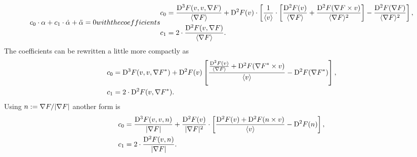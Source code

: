 \begin{subequations}
    \begin{align}
        c_0 \mult \alpha  +
        c_1 \mult \dot{ \alpha }  +
        \ddot{ \alpha }
        =
        0
    \end{align}
    with the coefficients
    \begin{align}
        c_0
        &=
        \frac{ \diff{3}{F}( v, v, \grad{F} ) }{ \skaq{\grad{F}} }  +
        \diff{2}{F}( v ) \mult
        \left[ \frac{ 1 }{ \skaq{v} } \mult
        \left[ \frac{ \diff{2}{F}( v ) }{ \skaq{\grad{F}} }  +
        \frac{ \diff{2}{F}( \grad{F} \times v ) }{ \skaq{\grad{F}}^2 } \right]
        -  \frac{ \diff{2}{F}( \grad{F} ) }{ \skaq{\grad{F}}^2 } \right] ,
        \\
        c_1
        &=
        2 \mult \frac{ \diff{2}{F}( v, \grad{F} ) }{ \skaq{\grad{F}} } .
    \end{align}
\end{subequations}
The coefficients can be rewritten a little more compactly as
\begin{subequations}
    \begin{align}
        c_0   &=
        \mathrm{D}^{ 3 }F( v, v, {\nabla F}^* )  +
        \mathrm{D}^{ 2 }F( v )
        \left[ \frac{ \frac{ \mathrm{D}^{ 2 }F( v ) }{ \langle \nabla F \rangle }  +
        \mathrm{D}^{ 2 }F( {\nabla F}^* \times v ) }{ \langle v \rangle }  -
        \mathrm{D}^{ 2 }F( {\nabla F}^* ) \right] ,
        \\
        c_1   &=   2 \cdot \mathrm{D}^{ 2 }F( v, {\nabla F}^* ) .
    \end{align}
\end{subequations}
Using $ n  :=  \nabla F / \lvert  \nabla F  \rvert $ another form is
\begin{subequations}
    \begin{align}
        c_0
        &=
        \frac{ \mathrm{D}^{ 3 }F( v, v, n ) }{ \lvert \nabla F \rvert }  +
        \frac{ \mathrm{D}^{ 2 }F( v ) }{ \lvert  \nabla F  \rvert^2 } \cdot
        \left[
        \frac{ \mathrm{D}^{ 2 }F( v ) +
        \mathrm{D}^{ 2 }F( n \times v ) }{ \langle v \rangle }
        -  \mathrm{D}^{ 2 }F( n ) \right] ,
        \\
        c_1
        &=
        2 \cdot \frac{ \mathrm{D}^{ 2 }F( v, n ) }{ \lvert \nabla F \rvert } .
    \end{align}
\end{subequations}


